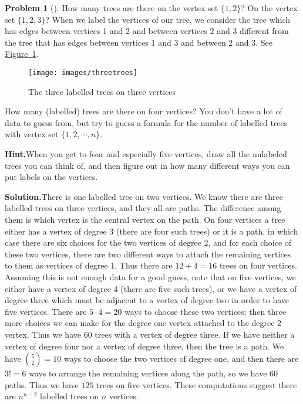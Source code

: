 \documentclass[10pt,]{book}
\theoremstyle{plain}
\theoremstyle{definition}
\newtheorem{activity}[project]{Problem}
\theoremstyle{definition}
\numberwithin{equation}{chapter}
\begin{document}
\begin{activity}[]\label{Prufer}
How many trees are there on the vertex set \(\{1,2\}\)? On the vertex set \(\{1,2,3\}\)? When we label the vertices of our tree, we consider the tree which has edges between vertices 1 and 2 and between vertices 2 and 3 different from the tree that has edges between vertices 1 and 3 and between 2 and 3. See \hyperref[differenttrees]{Figure~\ref{differenttrees}}.%
\begin{figure}
\centering
\texttt{[image: images/threetrees]}
\caption{The three labelled trees on three vertices\label{differenttrees}}
\end{figure}
How many (labelled) trees are there on four vertices? You don't have a lot of data to guess from, but try to guess a formula for the number of labelled trees with vertex set \(\{1,2,\cdots,n\}\).%
\par\medskip\noindent%
\textbf{Hint.}\quad When you get to four and especially five vertices, draw all the unlabeled trees you can think of, and then figure out in how many different ways you can put labels on the vertices.%
\par\medskip\noindent%
\textbf{Solution.}\quad There is one labelled tree on two vertices. We know there are three labelled trees on three vertices, and they all are paths. The difference among them is which vertex is the central vertex on the path. On four vertices a tree either has a vertex of degree 3 (there are four such trees) or it is a path, in which case there are six choices for the two vertices of degree 2, and for each choice of these two vertices, there are two different ways to attach the remaining vertices to them as vertices of degree 1. Thus there are \(12+4=16\) trees on four vertices. Assuming this is not enough data for a good guess, note that on five vertices, we either have a vertex of degree 4 (there are five such trees), or we have a vertex of degree three which must be adjacent to a vertex of degree two in order to have five vertices. There are \(5\cdot4=20\) ways to choose these two vertices; then three more choices we can make for the degree one vertex attached to the degree 2 vertex. Thus we have 60 trees with a vertex of degree three. If we have neither a vertex of degree four nor a vertex of degree three, then the tree is a path. We have \(\binom{5}{2}=10\) ways to choose the two vertices of degree one, and then there are \(3!=6\) ways to arrange the remaining vertices along the path, so we have 60 paths. Thus we have \(125\) trees on five vertices. These computations suggest there are \(n^{n-2}\) labelled trees on \(n\) vertices.%
\end{activity}
\end{document}
